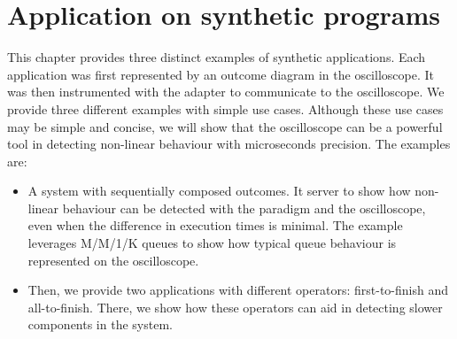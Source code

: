 \chapter{Application on synthetic programs}
    This chapter provides three distinct examples of synthetic applications. Each application was first represented by an outcome diagram in the oscilloscope. It was then instrumented with the adapter to communicate to the oscilloscope.
    We provide three different examples with simple use cases. Although these use cases may be simple and concise, we will show that the oscilloscope can be a powerful tool in detecting non-linear behaviour with microseconds precision. The examples are:
    \begin{itemize}
        \item A system with sequentially composed outcomes. It server to show how non-linear behaviour can be detected with the paradigm and the oscilloscope, even when the difference in execution times is minimal. The example leverages M/M/1/K queues to show how typical queue behaviour is represented on the oscilloscope.
        \item Then, we provide two applications with different operators: first-to-finish and all-to-finish. There, we show how these operators can aid in detecting slower components in the system.
    \end{itemize}
    
    
    
